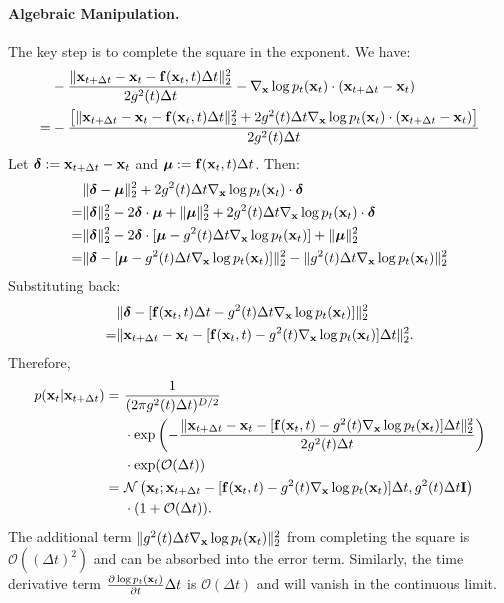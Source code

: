 \paragraph{Algebraic Manipulation.}
The key step is to complete the square in the exponent. We have:
\begin{align*}
    &-\frac{\|{\mathbf{x}}_{t+\Delta t} - {\mathbf{x}}_t - {\mathbf{f}}({\mathbf{x}}_t, t) \Delta t\|_2^2}{2 g^2(t) \Delta t} - \nabla_{{\mathbf{x}}} \log p_t({\mathbf{x}}_t) \cdot ({\mathbf{x}}_{t+\Delta t} - {\mathbf{x}}_t) \nonumber \\
    = &-\frac{\left[\|{\mathbf{x}}_{t+\Delta t} - {\mathbf{x}}_t - {\mathbf{f}}({\mathbf{x}}_t, t) \Delta t\|_2^2 + 2 g^2(t) \Delta t \nabla_{{\mathbf{x}}} \log p_t({\mathbf{x}}_t) \cdot ({\mathbf{x}}_{t+\Delta t} - {\mathbf{x}}_t)\right]}{2 g^2(t) \Delta t} 
\end{align*}
Let $\boldsymbol{\delta} := {\mathbf{x}}_{t+\Delta t} - {\mathbf{x}}_t$ and $\boldsymbol{\mu} := {\mathbf{f}}({\mathbf{x}}_t, t) \Delta t$. Then:
\begin{align*}
    &\|\boldsymbol{\delta} - \boldsymbol{\mu}\|_2^2 + 2 g^2(t) \Delta t \nabla_{{\mathbf{x}}} \log p_t({\mathbf{x}}_t) \cdot \boldsymbol{\delta} \nonumber \\
    = &\|\boldsymbol{\delta}\|_2^2 - 2\boldsymbol{\delta} \cdot \boldsymbol{\mu} + \|\boldsymbol{\mu}\|_2^2 + 2 g^2(t) \Delta t \nabla_{{\mathbf{x}}} \log p_t({\mathbf{x}}_t) \cdot \boldsymbol{\delta} \nonumber \\
    = &\|\boldsymbol{\delta}\|_2^2 - 2\boldsymbol{\delta} \cdot [\boldsymbol{\mu} - g^2(t) \Delta t \nabla_{{\mathbf{x}}} \log p_t({\mathbf{x}}_t)] + \|\boldsymbol{\mu}\|_2^2 \nonumber \\
    = &\|\boldsymbol{\delta} - [\boldsymbol{\mu} - g^2(t) \Delta t \nabla_{{\mathbf{x}}} \log p_t({\mathbf{x}}_t)]\|_2^2 - \|g^2(t) \Delta t \nabla_{{\mathbf{x}}} \log p_t({\mathbf{x}}_t)\|_2^2 
\end{align*}
Substituting back:
\begin{align*}
    &\|\boldsymbol{\delta} - [{\mathbf{f}}({\mathbf{x}}_t, t) \Delta t - g^2(t) \Delta t \nabla_{{\mathbf{x}}} \log p_t({\mathbf{x}}_t)]\|_2^2 \nonumber \\
    = &\|{\mathbf{x}}_{t+\Delta t} - {\mathbf{x}}_t - [{\mathbf{f}}({\mathbf{x}}_t, t) - g^2(t) \nabla_{{\mathbf{x}}} \log p_t({\mathbf{x}}_t)] \Delta t\|_2^2. 
\end{align*}
Therefore,
\begin{align*}
    p({\mathbf{x}}_t | {\mathbf{x}}_{t+\Delta t}) 
    =~&\frac{1}{(2\pi g^2(t) \Delta t)^{D/2}} \nonumber \\
    \quad &\cdot \exp\left(-\frac{\|{\mathbf{x}}_{t+\Delta t} - {\mathbf{x}}_t - [{\mathbf{f}}({\mathbf{x}}_t, t) - g^2(t) \nabla_{{\mathbf{x}}} \log p_t({\mathbf{x}}_t)] \Delta t\|_2^2}{2 g^2(t) \Delta t}\right) \nonumber \\
    \quad &\cdot \exp(\mathcal{O}(\Delta t)) \nonumber \\
    =~&\mathcal{N}\left({\mathbf{x}}_t; {\mathbf{x}}_{t+\Delta t} - [{\mathbf{f}}({\mathbf{x}}_t, t) - g^2(t) \nabla_{{\mathbf{x}}} \log p_t({\mathbf{x}}_t)] \Delta t, g^2(t) \Delta t \mathbf{I}\right) \nonumber \\
    \quad &\cdot (1 + \mathcal{O}(\Delta t)).
\end{align*}
The additional term $\|g^2(t) \Delta t \nabla_{{\mathbf{x}}} \log p_t({\mathbf{x}}_t)\|_2^2$ from completing the square is $\mathcal{O}((\Delta t)^2)$ and can be absorbed into the error term. Similarly, the time derivative term $\frac{\partial \log p_t({\mathbf{x}}_t)}{\partial t} \Delta t$ is $\mathcal{O}(\Delta t)$ and will vanish in the continuous limit.

